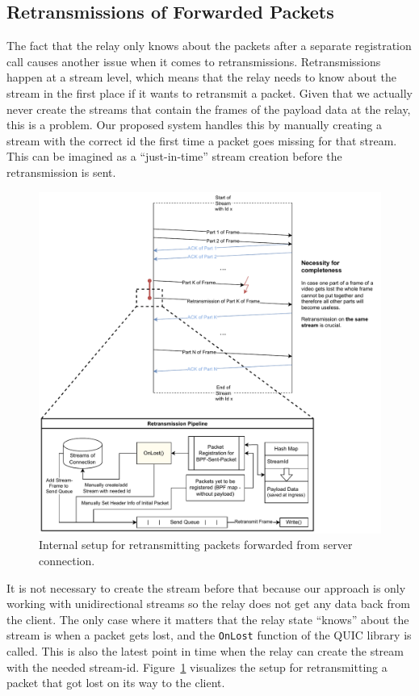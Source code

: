 \subsection{Retransmissions of Forwarded Packets}
The fact that the relay only knows about the packets after a separate registration call causes 
another issue when it comes to retransmissions.
Retransmissions happen at a stream level, which means that the relay needs to know about the 
stream in the first place if it wants to retransmit a packet.
Given that we actually never create the streams that contain the frames of the payload data 
at the relay, this is a problem.
Our proposed system handles this by manually creating a stream with the correct id the first
time a packet goes missing for that stream.
This can be imagined as a ``just-in-time'' stream creation before the retransmission is sent.

\begin{figure}[H]
    \centering
    \includegraphics[width=\textwidth]{figures/03_fast_relays/retransmission.drawio.pdf}
    \caption[Packet retransmission schematic]{Internal setup for retransmitting packets forwarded from server connection.}\label{fig:packet-retransmission}
\end{figure}

\noindent
It is not necessary to create the stream before that because our approach is only working with 
unidirectional streams so the relay does not get any data back from the client.
The only case where it matters that the relay state ``knows'' about the stream is when a packet
gets lost, and the \verb|OnLost| function of the QUIC library is called.
This is also the latest point in time when the relay can create the stream with the needed stream-id.
Figure~\ref{fig:packet-retransmission} visualizes the setup for retransmitting a packet that 
got lost on its way to the client. 